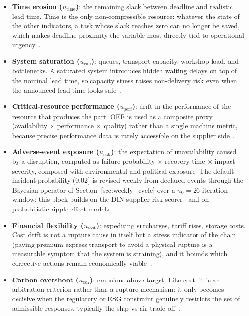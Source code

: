 \begin{itemize}
    \item \textbf{Time erosion ($u_{\text{time}}$)}: the remaining slack between deadline and realistic lead time. Time is the only non-compressible resource: whatever the state of the other indicators, a task whose slack reaches zero can no longer be saved, which makes deadline proximity the variable most directly tied to operational urgency~\autocite{cohen2021assigning,bojarski2021,sun2020combating,sawik2013integrated}.
    \item \textbf{System saturation ($u_{\text{cap}}$)}: queues, transport capacity, workshop load, and bottlenecks. A saturated system introduces hidden waiting delays on top of the nominal lead time, so capacity stress raises non-delivery risk even when the announced lead time looks safe~\autocite{tomlin2006value,hosseini2019resilient,taghavi2024sustainable}.
    \item \textbf{Critical-resource performance ($u_{\text{perf}}$)}: drift in the performance of the resource that produces the part. OEE is used as a composite proxy (availability $\times$ performance $\times$ quality) rather than a single machine metric, because precise performance data is rarely accessible on the supplier side~\autocite{mokhtar2019supplier,hlioui2017joint}.
    \item \textbf{Adverse-event exposure ($u_{\text{risk}}$)}: the expectation of unavailability caused by a disruption, computed as failure probability $\times$ recovery time $\times$ impact severity, composed with environmental and political exposure. The default incident probability (0.02) is revised weekly from declared events through the Bayesian operator of Section~\ref{sec:weekly_cycle} over a $n_0 = 26$ iteration window; this block builds on the DIN supplier risk scorer~\autocite{kabouche2025scoring} and on probabilistic ripple-effect models~\autocite{hosseini2020ripple,liu2021robust,hosseini2020bayesian}.
    \item \textbf{Financial flexibility ($u_{\text{cost}}$)}: expediting surcharges, tariff rises, storage costs. Cost drift is not a rupture cause in itself but a stress indicator of the chain (paying premium express transport to avoid a physical rupture is a measurable symptom that the system is straining), and it bounds which corrective actions remain economically viable~\autocite{shen2019managing,tomlin2006value}.
    \item \textbf{Carbon overshoot ($u_{\text{co2}}$)}: emissions above target. Like cost, it is an arbitration criterion rather than a rupture mechanism: it only becomes decisive when the regulatory or ESG constraint genuinely restricts the set of admissible responses, typically the ship-vs-air trade-off~\autocite{hoen2014effect,smartfreight2023glec,iso14083}.
\end{itemize}


